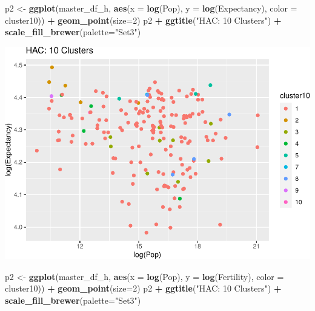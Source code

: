 \documentclass[]{article}
\newenvironment{Shaded}{\begin{snugshade}}{\end{snugshade}}
\newcommand{\DataTypeTok}[1]{\textcolor[rgb]{0.13,0.29,0.53}{#1}}
\newcommand{\DecValTok}[1]{\textcolor[rgb]{0.00,0.00,0.81}{#1}}
\newcommand{\KeywordTok}[1]{\textcolor[rgb]{0.13,0.29,0.53}{\textbf{#1}}}
\newcommand{\NormalTok}[1]{#1}
\newcommand{\OperatorTok}[1]{\textcolor[rgb]{0.81,0.36,0.00}{\textbf{#1}}}
\newcommand{\StringTok}[1]{\textcolor[rgb]{0.31,0.60,0.02}{#1}}
\begin{document}
\begin{Shaded}
\begin{Highlighting}[]
\NormalTok{p2 <-}\StringTok{ }\KeywordTok{ggplot}\NormalTok{(master_df_h, }\KeywordTok{aes}\NormalTok{(}\DataTypeTok{x =} \KeywordTok{log}\NormalTok{(Pop), }\DataTypeTok{y =} \KeywordTok{log}\NormalTok{(Expectancy), }\DataTypeTok{color =}\NormalTok{ cluster10)) }\OperatorTok{+}
\StringTok{  }\KeywordTok{geom_point}\NormalTok{(}\DataTypeTok{size=}\DecValTok{2}\NormalTok{)}
\NormalTok{p2 }\OperatorTok{+}\StringTok{ }\KeywordTok{ggtitle}\NormalTok{(}\StringTok{"HAC: 10 Clusters"}\NormalTok{) }\OperatorTok{+}\StringTok{ }\KeywordTok{scale_fill_brewer}\NormalTok{(}\DataTypeTok{palette=}\StringTok{"Set3"}\NormalTok{)}
\end{Highlighting}
\end{Shaded}

\includegraphics{eda_files/figure-latex/unnamed-chunk-30-6.pdf}

\begin{Shaded}
\begin{Highlighting}[]
\NormalTok{p2 <-}\StringTok{ }\KeywordTok{ggplot}\NormalTok{(master_df_h, }\KeywordTok{aes}\NormalTok{(}\DataTypeTok{x =} \KeywordTok{log}\NormalTok{(Pop), }\DataTypeTok{y =} \KeywordTok{log}\NormalTok{(Fertility), }\DataTypeTok{color =}\NormalTok{ cluster10)) }\OperatorTok{+}
\StringTok{  }\KeywordTok{geom_point}\NormalTok{(}\DataTypeTok{size=}\DecValTok{2}\NormalTok{)}
\NormalTok{p2 }\OperatorTok{+}\StringTok{ }\KeywordTok{ggtitle}\NormalTok{(}\StringTok{"HAC: 10 Clusters"}\NormalTok{) }\OperatorTok{+}\StringTok{ }\KeywordTok{scale_fill_brewer}\NormalTok{(}\DataTypeTok{palette=}\StringTok{"Set3"}\NormalTok{)}
\end{Highlighting}
\end{Shaded}
\end{document}
